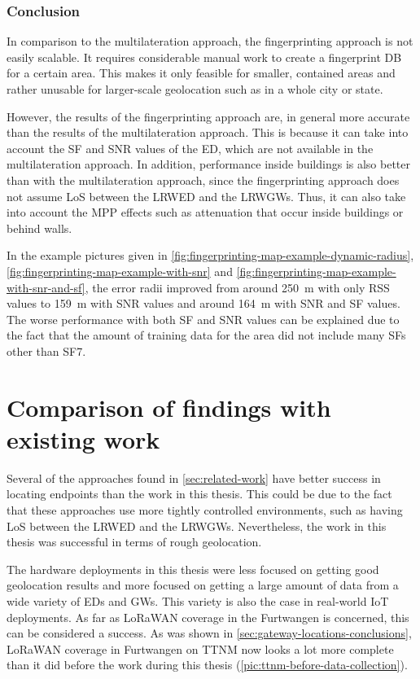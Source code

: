 \subsubsection{Conclusion}

In comparison to the multilateration approach, the fingerprinting approach is not easily scalable.
It requires considerable manual work to create a fingerprint \ac{DB} for a certain area.
This makes it only feasible for smaller, contained areas and rather unusable for larger-scale geolocation such as in a whole city or state.

However, the results of the fingerprinting approach are, in general more accurate than the results of the multilateration approach.
This is because it can take into account the \ac{SF} and \ac{SNR} values of the \acl{ED}, which are not available in the multilateration approach.
In addition, performance inside buildings is also better than with the multilateration approach, since the fingerprinting approach does not assume \ac{LoS} between the \acl{LRWED} and the \aclp{LRWGW}.
Thus, it can also take into account the \ac{MPP} effects such as attenuation that occur inside buildings or behind walls.

In the example pictures given in \cref{fig:fingerprinting-map-example-dynamic-radius}, \cref{fig:fingerprinting-map-example-with-snr} and \cref{fig:fingerprinting-map-example-with-snr-and-sf}, the error radii improved from around \SI{250}{\meter} with only \ac{RSS} values to \SI{159}{\meter} with \ac{SNR} values and around \SI{164}{\meter} with \ac{SNR} and \ac{SF} values.
The worse performance with both \ac{SF} and \ac{SNR} values can be explained due to the fact that the amount of training data for the area did not include many \aclp{SF} other than \acs{SF}7.

\section{Comparison of findings with existing work}

Several of the approaches found in \cref{sec:related-work} have better success in locating endpoints than the work in this thesis.
This could be due to the fact that these approaches use more tightly controlled environments, such as having \ac{LoS} between the \acl{LRWED} and the \aclp{LRWGW}.
Nevertheless, the work in this thesis was successful in terms of rough geolocation.

The hardware deployments in this thesis were less focused on getting good geolocation results and more focused on getting a large amount of data from a wide variety of \aclp{ED} and \aclp{GW}.
This variety is also the case in real-world \ac{IoT} deployments.
As far as \ac{LoRaWAN} coverage in the Furtwangen is concerned, this can be considered a success.
As was shown in \cref{sec:gateway-locations-conclusions}, \ac{LoRaWAN} coverage in Furtwangen on \ac{TTNM} now looks a lot more complete than it did before the work during this thesis (\cref{pic:ttnm-before-data-collection}).

